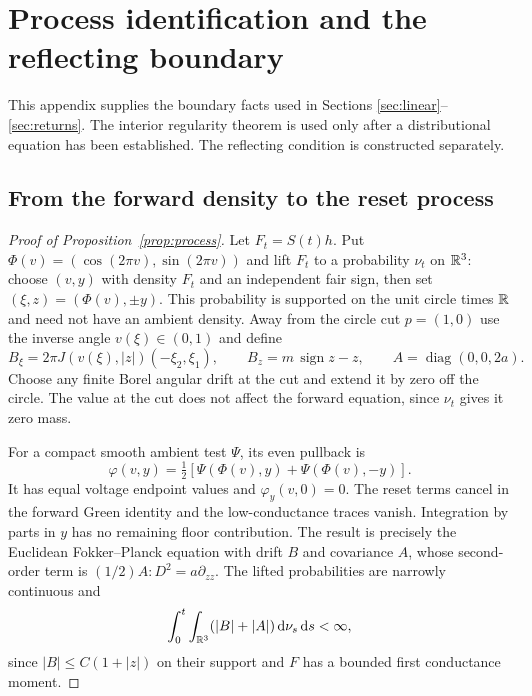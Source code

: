 \section{Process identification and the reflecting boundary}\label{app:boundary}

This appendix supplies the boundary facts used in Sections
\ref{sec:linear}--\ref{sec:returns}. The interior regularity theorem
is used only after a distributional equation has been established.
The reflecting condition is constructed separately.

\subsection{From the forward density to the reset process}

\begin{proof}[Proof of Proposition~\ref{prop:process}]
Let $F_t=S(t)h$. Put
$\Phi(v)=(\cos(2\pi v),\sin(2\pi v))$ and lift $F_t$ to a
probability $\nu_t$ on $\mathbb R^3$: choose $(v,y)$ with density $F_t$
and an independent fair sign, then set $(\xi,z)=(\Phi(v),\pm y)$.
This probability is supported on the unit circle times $\mathbb R$ and
need not have an ambient density. Away from the circle cut
$p=(1,0)$ use the inverse angle $v(\xi)\in(0,1)$ and define
\[
 B_\xi=2\pi J(v(\xi),|z|)(-\xi_2,\xi_1),\qquad
 B_z=m\,\operatorname{sign}z-z,\qquad
 A=\operatorname{diag}(0,0,2a).
\]
Choose any finite Borel angular drift at the cut and extend it
by zero off the circle. The value at the cut does not affect
the forward equation, since $\nu_t$ gives it zero mass.

For a compact smooth ambient test $\Psi$, its even pullback is
\[
 \varphi(v,y)=\tfrac12[\Psi(\Phi(v),y)+\Psi(\Phi(v),-y)].
\]
It has equal voltage endpoint values and $\varphi_y(v,0)=0$.
The reset terms cancel in the forward Green identity and the
low-conductance traces vanish. Integration by parts in $y$ has
no remaining floor contribution. The result is precisely the
Euclidean Fokker--Planck equation with drift $B$ and covariance
$A$, whose second-order term is $(1/2)A:D^2=a\partial_{zz}$.
The lifted probabilities are narrowly continuous and
\[
 \int_0^t\int_{\mathbb R^3}(|B|+|A|)\,\mathrm d\nu_s\,\mathrm d s<\infty,
\]
since $|B|\le C(1+|z|)$ on their support and $F$ has a bounded
first conductance moment.


\end{proof}
